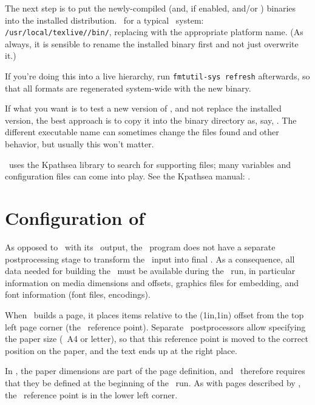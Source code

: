 \documentclass{pdftexmanual}
\begin{document}
{The next step is to put the newly-compiled  (and, if
enabled,  and/or ) binaries into
the installed distribution. \Eg\ for a typical \TEXLIVE\ system:\\
\texttt{/usr/local/texlive/\rcsyear/bin/}, replacing
 with the appropriate platform name. (As always, it
is sensible to rename the installed  binary first and
not just overwrite it.)

If you're doing this into a live hierarchy, run \verb|fmtutil-sys refresh|
afterwards, so that all formats are regenerated system-wide
with the new  binary.

If what you want is to test a new version of , and not
replace the installed version, the best approach is to copy it into the
binary directory as, say, . The different
executable name can sometimes change the files found and other behavior,
but usually this won't matter.

\PDFTEX\ uses the Kpathsea library to search for supporting files; many
variables and configuration files can come into play. See the Kpathsea
manual: .

\section{Configuration of \PDFTEX}
\label{sec.cfg}

As opposed to \TEX\ with its \DVI\ output, the \PDFTEX\ program does not
have a separate postprocessing stage to transform the \TEX\ input into
final \PDF. As a consequence, all data needed for building the \PDF\
must be available during the \PDFTEX\ run, in particular information on
media dimensions and offsets, graphics files for embedding, and font
information (font files, encodings).

When \TEX\ builds a page, it places items relative to the (1in,1in)
offset from the top left page corner (the \DVI\ reference point).
Separate \DVI\ postprocessors allow specifying the paper size (\eg\ A4
or letter), so that this reference point is moved to the correct
position on the paper, and the text ends up at the right place.

In \PDF, the paper dimensions are part of the page definition, and
\PDFTEX\ therefore requires that they be defined at the beginning of the
\PDFTEX\ run. As with pages described by \POSTSCRIPT, the \PDF\
reference point is in the lower left corner.

}
\end{document}
